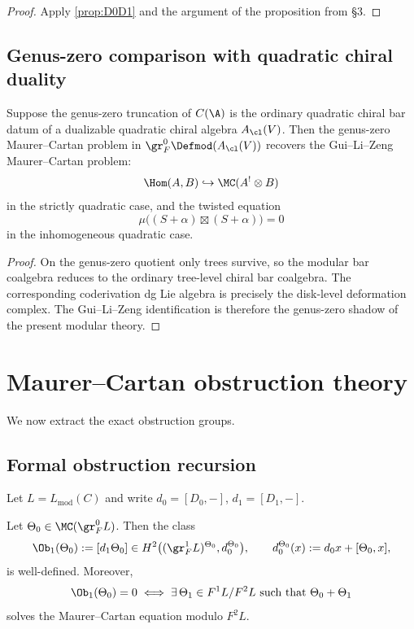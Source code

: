 \begin{proof}
Apply \cref{prop:D0D1} and the argument of the proposition from \S3.
\end{proof}

\subsection{Genus-zero comparison with quadratic chiral duality}

\begin{proposition}
Suppose the genus-zero truncation of $C(\A)$ is the ordinary quadratic chiral bar datum
of a dualizable quadratic chiral algebra $A_{\cl}(V)$. Then the genus-zero Maurer--Cartan
problem in $\gr_F^0\Defmod(A_{\cl}(V))$ recovers the Gui--Li--Zeng Maurer--Cartan problem:
\[
\Hom(A,B)\hookrightarrow \MC(A^!\otimes B)
\]
in the strictly quadratic case, and the twisted equation
\[
\mu\big((S+\alpha)\boxtimes (S+\alpha)\big)=0
\]
in the inhomogeneous quadratic case.
\end{proposition}

\begin{proof}
On the genus-zero quotient only trees survive, so the modular bar coalgebra reduces to the
ordinary tree-level chiral bar coalgebra. The corresponding coderivation dg Lie algebra is
precisely the disk-level deformation complex. The Gui--Li--Zeng identification is therefore
the genus-zero shadow of the present modular theory.
\end{proof}

\section{Maurer--Cartan obstruction theory}

We now extract the exact obstruction groups.

\subsection{Formal obstruction recursion}

Let $L=L_{\mathrm{mod}}(C)$ and write $d_0=[D_0,-]$, $d_1=[D_1,-]$.

\begin{theorem}\label{thm:Ob1}
Let $\Theta_0\in \MC(\gr_F^0L)$. Then the class
\[
\Ob_1(\Theta_0):=[d_1\Theta_0]
\in
H^2\big((\gr_F^1L)^{\Theta_0},d_0^{\Theta_0}\big),
\qquad
d_0^{\Theta_0}(x):=d_0x+[\Theta_0,x],
\]
is well-defined. Moreover,
\[
\Ob_1(\Theta_0)=0
\iff
\exists\,\Theta_1\in F^1L/F^2L
\text{ such that }
\Theta_0+\Theta_1
\]
solves the Maurer--Cartan equation modulo $F^2L$.
\end{theorem}

